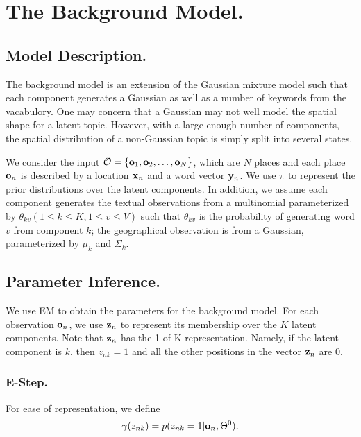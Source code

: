 
\section{The Background Model.}
\label{sect:background}

\subsection{Model Description.}

The background model is an extension of the Gaussian mixture model such that
each component generates a Gaussian as well as a number of keywords from the
vacabulory.  One may concern that a Gaussian may not well model the spatial
shape for a latent topic. However, with a large enough number of components,
the spatial distribution of a non-Gaussian topic is simply split into several
states.

We consider the input $\mathcal{O} = \{\mathbf{o}_1, \mathbf{o}_2, \ldots, \mathbf{o}_N\}$, which are $N$ places
and each place $\mathbf{o}_n$ is described by a location $\mathbf{x}_n$ and a word vector
$\mathbf{y}_n$.  We use $\pi$ to represent the prior distributions over the latent
components.  In addition, we assume each component generates the textual
observations from a multinomial parameterized by $\theta_{kv} (1 \le k \le K, 1
\le v \le V)$ such that $\theta_{kv}$ is the probability of generating word $v$
from component $k$; the geographical observation is from a Gaussian,
parameterized by $\mu_k$ and $\Sigma_k$.

\subsection{Parameter Inference.}

We use EM to obtain the parameters for the background model.
For each observation $\mathbf{o}_n$, we use $\mathbf{z}_n$ to represent its membership over the $K$ latent
components. Note that $\mathbf{z}_n$ has the 1-of-K representation. Namely, if the latent component
is $k$, then $z_{nk} = 1$ and all the other positions in the vector $\mathbf{z}_n$ are 0. 

\subsubsection{E-Step.}
For ease of representation, we define
$$
\gamma(z_{nk}) = p(z_{nk} = 1 | \mathbf{o}_n, \Theta^0).
$$

